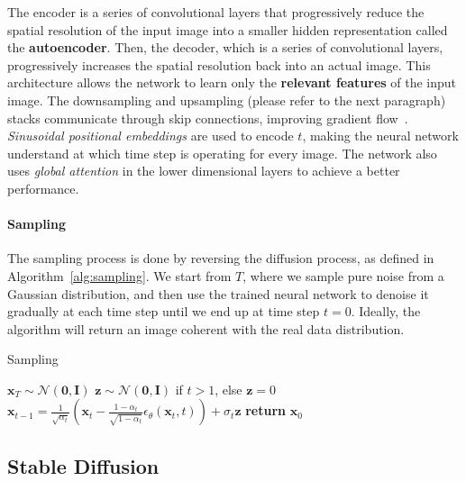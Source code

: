 \documentclass[preprint]{elsarticle}
\begin{document}
The encoder is a series of convolutional layers that progressively reduce the spatial resolution of the input image  into a smaller hidden representation called the \textbf{autoencoder}.
Then, the decoder, which is a series of convolutional layers, progressively increases the spatial resolution back into an actual image. This architecture allows the network to learn only the \textbf{relevant features} of the input image. The downsampling and upsampling (please refer to the next paragraph)  stacks communicate through skip connections, improving gradient flow~\cite{he2015deep}. \emph{Sinusoidal positional embeddings} are used to encode $t$,  making the neural network understand at which time step is operating for every image.
The network also uses \emph{global attention} in the lower dimensional layers to achieve a better performance.

\paragraph{Sampling}
The sampling process is done by reversing the diffusion process, as defined in Algorithm~\ref{alg:sampling}. We start from $T$, where we sample pure noise from a Gaussian distribution, 
and then use the trained neural network to denoise it gradually at each time step until we end up at time step $t=0$.
Ideally, the algorithm will return an image coherent with the real data distribution.

\begin{algorithm}[b]
    \caption{Sampling}\label{alg:sampling}
    \begin{algorithmic}[1]
    \State $\mathbf{x}_T \sim \mathcal{N}(\mathbf{0},\mathbf{I})$
        \State $\mathbf{z} \sim \mathcal{N}(\mathbf{0}, \mathbf{I})$ if $t >1$, else $\mathbf{z} =0$
        \State $\mathbf{x}_{t-1} = \frac{1}{\sqrt{\alpha_t}}\left(\mathbf{x}_t - \frac{1-\alpha_t}{\sqrt{1-\bar{\alpha}_t}}\epsilon_\theta(\mathbf{x}_t,t)\right) + \sigma_t \mathbf{z}$
    \EndFor
    \State \textbf{return} $\mathbf{x}_0$
    \end{algorithmic}
\end{algorithm}





\subsection{Stable Diffusion}\label{sec:stable-diffusion}
\end{document}
